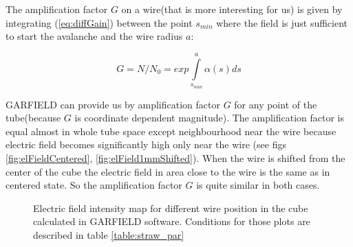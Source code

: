 \documentclass[]{article}
\begin{document}
	The amplification factor $G$ on a wire(that is more interesting for us) is given by integrating (\ref{eq:diffGain}) between the point $s_{min}$ where the field is just sufficient to start the avalanche and the wire radius $a$:
	
	\begin{equation}
	G = N/N_0 = exp \int\limits_{s_{min}}^{a} \alpha(s) ds
	\end{equation}
	
	GARFIELD can provide us by amplification factor $G$ for any point of the tube(because  $G$ is coordinate dependent magnitude). The amplification factor is equal almost in whole tube space except neighbourhood near the wire because electric field  becomes significantly high only near the wire (see figs \ref{fig:elFieldCentered}, \ref{fig:elField1mmShifted}). When the wire is shifted from the center of the cube the electric field in area close to the wire is the same as in centered state. So the amplification factor $G$ is quite similar in both cases.
	
	\begin{figure}[h!] 
		\centering
		\qquad
		\caption{Electric field intensity map for different wire position in the cube calculated in GARFIELD software. Conditions for those plots are described in table \ref{table:straw_par} }
	\end{figure}
	
\end{document}
